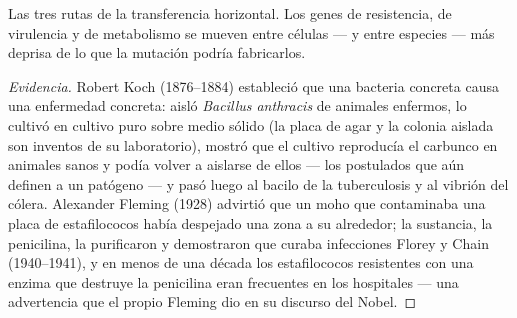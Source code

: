 \begin{omfigure}

{\small Las tres rutas de la transferencia horizontal. Los genes de
resistencia, de virulencia y de metabolismo se mueven entre células ---
y entre especies --- más deprisa de lo que la mutación podría fabricarlos.}
\end{omfigure}

\begin{proof}[Evidencia]
Robert Koch (1876--1884) estableció que una bacteria concreta causa una
enfermedad concreta: aisló \emph{Bacillus anthracis} de animales
enfermos, lo cultivó en cultivo puro sobre medio sólido (la placa de agar
y la colonia aislada son inventos de su laboratorio), mostró que el
cultivo reproducía el carbunco en animales sanos y podía volver a
aislarse de ellos --- los postulados que aún definen a un patógeno --- y
pasó luego al bacilo de la tuberculosis y al vibrión del cólera.
Alexander Fleming (1928) advirtió que un moho que contaminaba una placa
de estafilococos había despejado una zona a su alrededor; la sustancia,
la penicilina, la purificaron y demostraron que curaba infecciones Florey
y Chain (1940--1941), y en menos de una década los estafilococos
resistentes con una enzima que destruye la penicilina eran frecuentes en
los hospitales --- una advertencia que el propio Fleming dio en su
discurso del Nobel.
\end{proof}

